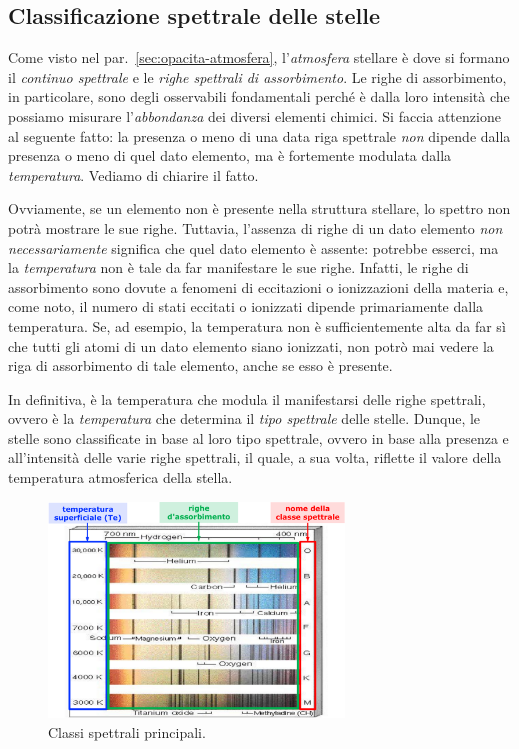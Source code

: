 \subsection{Classificazione spettrale delle stelle}
Come visto nel par.~\ref{sec:opacita-atmosfera}, l'\emph{atmosfera} stellare è dove si formano il \emph{continuo spettrale} e le \emph{righe spettrali di assorbimento}. Le righe di assorbimento, in particolare, sono degli osservabili fondamentali perché è dalla loro intensità che possiamo misurare l'\emph{abbondanza} dei diversi elementi chimici. Si faccia attenzione al seguente fatto: la presenza o meno di una data riga spettrale \emph{non} dipende dalla presenza o meno di quel dato elemento, ma è fortemente modulata dalla \emph{temperatura}. Vediamo di chiarire il fatto.

Ovviamente, se un elemento non è presente nella struttura stellare, lo spettro non potrà mostrare le sue righe. Tuttavia, l'assenza di righe di un dato elemento \emph{non necessariamente} significa che quel dato elemento è assente: potrebbe esserci, ma la \emph{temperatura} non è tale da far manifestare le sue righe. Infatti, le righe di assorbimento sono dovute a fenomeni di eccitazioni o ionizzazioni della materia e, come noto,  il numero di stati eccitati o ionizzati dipende primariamente dalla temperatura. Se, ad esempio, la temperatura non è sufficientemente alta da far sì che tutti gli atomi di un dato elemento siano ionizzati, non potrò mai vedere la riga di assorbimento di tale elemento, anche se esso è presente.

In definitiva, è la temperatura che modula il manifestarsi delle righe spettrali, ovvero è la \emph{temperatura} che determina il \emph{tipo spettrale} delle stelle. Dunque, le stelle sono classificate in base al loro tipo spettrale, ovvero in base alla presenza e all'intensità delle varie righe spettrali, il quale, a sua volta, riflette il valore della temperatura atmosferica della stella.

\begin{figure}
    \centering
    \includegraphics[width=0.7\textwidth]{immagini/classificazione-spettrale-stelle.png}
    \caption{Classi spettrali principali.}
    \label{fig:classificazione-spettrale-stelle}
\end{figure}

